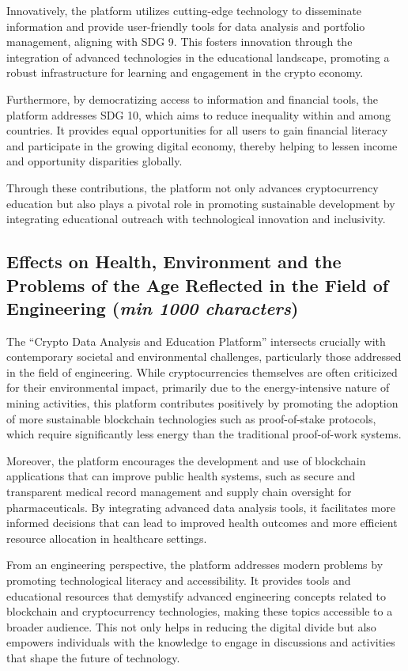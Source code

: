 \documentclass[12pt]{report}
\newcommand{\characters}[1]{(\textit{min #1 characters})}
\begin{document}
Innovatively, the platform utilizes cutting-edge technology to disseminate information and provide user-friendly tools for data analysis and portfolio management, aligning with SDG 9. This fosters innovation through the integration of advanced technologies in the educational landscape, promoting a robust infrastructure for learning and engagement in the crypto economy.

Furthermore, by democratizing access to information and financial tools, the platform addresses SDG 10, which aims to reduce inequality within and among countries. It provides equal opportunities for all users to gain financial literacy and participate in the growing digital economy, thereby helping to lessen income and opportunity disparities globally.

Through these contributions, the platform not only advances cryptocurrency education but also plays a pivotal role in promoting sustainable development by integrating educational outreach with technological innovation and inclusivity.

\subsection{Effects on Health, Environment and the Problems of the Age Reflected in the Field of Engineering \characters{1000}}
The ``Crypto Data Analysis and Education Platform'' intersects crucially with contemporary societal and environmental challenges, particularly those addressed in the field of engineering. While cryptocurrencies themselves are often criticized for their environmental impact, primarily due to the energy-intensive nature of mining activities, this platform contributes positively by promoting the adoption of more sustainable blockchain technologies such as proof-of-stake protocols, which require significantly less energy than the traditional proof-of-work systems.

Moreover, the platform encourages the development and use of blockchain applications that can improve public health systems, such as secure and transparent medical record management and supply chain oversight for pharmaceuticals. By integrating advanced data analysis tools, it facilitates more informed decisions that can lead to improved health outcomes and more efficient resource allocation in healthcare settings.

From an engineering perspective, the platform addresses modern problems by promoting technological literacy and accessibility. It provides tools and educational resources that demystify advanced engineering concepts related to blockchain and cryptocurrency technologies, making these topics accessible to a broader audience. This not only helps in reducing the digital divide but also empowers individuals with the knowledge to engage in discussions and activities that shape the future of technology.
\end{document}

